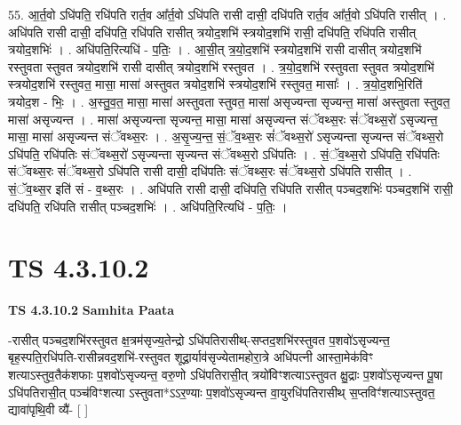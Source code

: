 \documentclass[17pt]{extarticle}
\begin{document}
55. आ॒र्त॒वो ऽधि॑पति॒ रधि॑पति रार्त॒व आ᳚र्त॒वो ऽधि॑पति रासी दासी॒ दधि॑पति रार्त॒व आ᳚र्त॒वो ऽधि॑पति रासीत् । . अधि॑पति रासी दासी॒ दधि॑पति॒ रधि॑पति रासीत् त्रयोद॒शभि॑ स्त्रयोद॒शभि॑ रासी॒ दधि॑पति॒ रधि॑पति रासीत् त्रयोद॒शभिः॑ । . अधि॑पति॒रित्यधि॑ - प॒तिः॒ । . आ॒सी॒त् त्र॒यो॒द॒शभि॑ स्त्रयोद॒शभि॑ रासी दासीत् त्रयोद॒शभि॑ रस्तुवता स्तुवत त्रयोद॒शभि॑ रासी दासीत् त्रयोद॒शभि॑ रस्तुवत । . त्र॒यो॒द॒शभि॑ रस्तुवता स्तुवत त्रयोद॒शभि॑ स्त्रयोद॒शभि॑ रस्तुवत॒ मासा॒ मासा॑ अस्तुवत त्रयोद॒शभि॑ स्त्रयोद॒शभि॑ रस्तुवत॒ मासाः᳚ । . त्र॒यो॒द॒शभि॒रिति॑ त्रयोद॒श - भिः॒ । . अ॒स्तु॒व॒त॒ मासा॒ मासा॑ अस्तुवता स्तुवत॒ मासा॑ असृज्यन्ता सृज्यन्त॒ मासा॑ अस्तुवता स्तुवत॒ मासा॑ असृज्यन्त । . मासा॑ असृज्यन्ता सृज्यन्त॒ मासा॒ मासा॑ असृज्यन्त संॅवथ्स॒रः सं॑ॅवथ्स॒रो॑ ऽसृज्यन्त॒ मासा॒ मासा॑ असृज्यन्त संॅवथ्स॒रः । . अ॒सृ॒ज्य॒न्त॒ सं॒ॅव॒थ्स॒रः सं॑ॅवथ्स॒रो॑ ऽसृज्यन्ता सृज्यन्त संॅवथ्स॒रो ऽधि॑पति॒ रधि॑पतिः संॅवथ्स॒रो॑ ऽसृज्यन्ता सृज्यन्त संॅवथ्स॒रो ऽधि॑पतिः । . सं॒ॅव॒थ्स॒रो ऽधि॑पति॒ रधि॑पतिः संॅवथ्स॒रः सं॑ॅवथ्स॒रो ऽधि॑पति रासी दासी॒ दधि॑पतिः संॅवथ्स॒रः सं॑ॅवथ्स॒रो ऽधि॑पति रासीत् । . सं॒ॅव॒थ्स॒र इति॑ सं - व॒थ्स॒रः । . अधि॑पति रासी दासी॒ दधि॑पति॒ रधि॑पति रासीत् पञ्चद॒शभिः॑ पञ्चद॒शभि॑ रासी॒ दधि॑पति॒ रधि॑पति रासीत् पञ्चद॒शभिः॑ । . अधि॑पति॒रित्यधि॑ - प॒तिः॒ । \newline
\pagebreak
{}

\section{ TS 4.3.10.2 }

\textbf{TS 4.3.10.2 } \newline
\textbf{Samhita Paata} \newline

-रासीत् पञ्चद॒शभि॑रस्तुवत क्ष॒त्रम॑सृज्य॒तेन्द्रो ऽधि॑पतिरासीथ्-सप्तद॒शभि॑रस्तुवत प॒शवो॑ऽसृज्यन्त॒ बृह॒स्पति॒रधि॑पति-रासीन्नवद॒शभि॑-रस्तुवत शूद्रा॒र्याव॑सृज्येतामहोरा॒त्रे अधि॑पत्नी आस्ता॒मेक॑विꣳ शत्याऽस्तुव॒तैक॑शफाः प॒शवो॑ऽसृज्यन्त॒ वरु॒णो ऽधि॑पतिरासी॒त् त्रयो॑विꣳशत्याऽस्तुवत क्षु॒द्राः प॒शवो॑ऽसृज्यन्त पू॒षा ऽधि॑पतिरासी॒त् पञ्च॑विꣳशत्या ऽस्तुवता*ऽऽर॒ण्याः प॒शवो॑ऽसृज्यन्त वा॒युरधि॑पतिरासीथ् स॒प्तविꣳ॑शत्याऽस्तुवत॒ द्यावा॑पृथि॒वी व्यै॑- [  ] \newline
\end{document}
